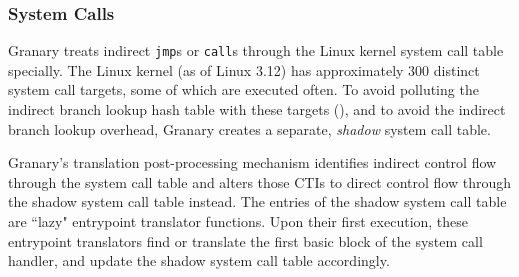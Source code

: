 \documentclass[preprint]{sigplanconf}
\begin{document}

\subsubsection{System Calls}

Granary treats indirect \texttt{jmp}s or \texttt{call}s through the Linux kernel system call table specially. The Linux kernel (as of Linux 3.12) has approximately 300 distinct system call targets, some of which are executed often. To avoid polluting the indirect branch lookup hash table with these targets (), and to avoid the indirect branch lookup overhead, Granary creates a separate, \emph{shadow} system call table.


Granary's translation post-processing mechanism identifies indirect control flow through the system call table and alters those CTIs to direct control flow through the shadow system call table instead. The entries of the shadow system call table are ``lazy" entrypoint translator functions. Upon their first execution, these entrypoint translators find or translate the first basic block of the system call handler, and update the shadow system call table accordingly. 

\end{document}
